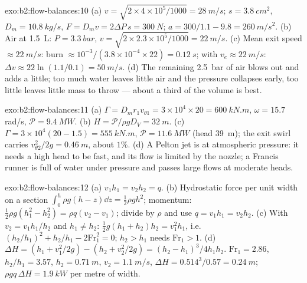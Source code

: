 \begin{solution}{exo:b2:flow-balances:10}
(a) $v = \sqrt{2 \times 4 \times 10^5/1000} = \qty{28}{m/s}$; $s = \qty{3.8}{cm^2}$, $D_m =
\qty{10.8}{kg/s}$, $F = D_mv = 2\Delta P\,s = \qty{300}{N}$; $a = 300/1.1 - 9.8 =
\qty{260}{m/s^2}$. (b) Air at \qty{1.5}{L}: $P = \qty{3.3}{bar}$, $v = \sqrt{2 \times 2.3 \times
10^5/1000} = \qty{22}{m/s}$. (c) Mean exit speed $\approx \qty{22}{m/s}$: burn $\approx 10^{-3}
/(3.8 \times 10^{-4} \times 22) = \qty{0.12}{s}$;  with $v_e \approx \qty{22}{m/s}$:
$\Delta v \approx 22\ln(1.1/0.1) = \qty{50}{m/s}$. (d) The remaining \qty{2.5}{bar} of air
blows out and adds a little; too much water leaves little air and the
pressure collapses early, too little leaves little mass to throw ---
about a third of the volume is best.
\end{solution}

\begin{solution}{exo:b2:flow-balances:11}
(a) $\Gamma = D_mr_1v_{\theta1} = 3 \times 10^4 \times 20 = \qty{600}{kN.m}$, $\omega = 15.7$ rad/s,
$\mathcal P = \qty{9.4}{MW}$. (b) $H = \mathcal P/\rho gD_V = \qty{32}{m}$. (c) $\Gamma = 3 \times
10^4(20 - 1.5) = \qty{555}{kN.m}$, $\mathcal P = \qty{11.6}{MW}$ (head \qty{39}{m}); the
exit swirl carries $v_{\theta2}^2/2g = \qty{0.46}{m}$, about $1\%$. (d) A Pelton jet
is at atmospheric pressure: it needs a high head to be fast, and its
flow is limited by the nozzle; a Francis runner is full of water under
pressure and passes large flows at moderate heads.
\end{solution}

\begin{solution}{exo:b2:flow-balances:12}
(a) $v_1h_1 = v_2h_2 = q$. (b) Hydrostatic force per unit width on a
section $\int_0^h\rho g(h - z)\dd z = \tfrac12\rho gh^2$; momentum: $\tfrac12\rho g(h_1^2
- h_2^2) = \rho q(v_2 - v_1)$; divide by $\rho$ and use $q = v_1h_1 = v_2h_2$.
(c) With $v_2 = v_1h_1/h_2$ and $h_1 \ne h_2$: $\tfrac12g(h_1 + h_2)h_2 = v_1^2h_1$,
i.e.\ $(h_2/h_1)^2 + h_2/h_1 - 2\mathrm{Fr}_1^2 = 0$; $h_2 > h_1$ needs $\mathrm{Fr}_1 > 1$.
(d) $\Delta H = (h_1 + v_1^2/2g) - (h_2 + v_2^2/2g) = (h_2 - h_1)^3/4h_1h_2$.
$\mathrm{Fr}_1 = 2.86$, $h_2/h_1 = 3.57$, $h_2 = \qty{0.71}{m}$, $v_2 = \qty{1.1}{m/s}$,
$\Delta H = 0.514^3/0.57 = \qty{0.24}{m}$; $\rho gq\,\Delta H = \qty{1.9}{kW}$ per metre of
width.
\end{solution}

